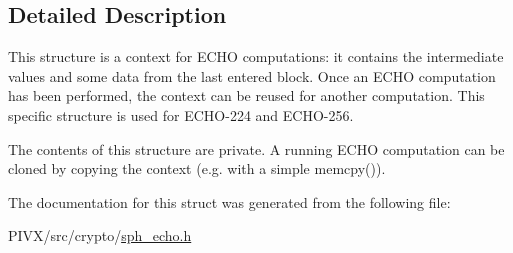 \subsection{Detailed Description}
This structure is a context for E\+C\+HO computations\+: it contains the intermediate values and some data from the last entered block. Once an E\+C\+HO computation has been performed, the context can be reused for another computation. This specific structure is used for E\+C\+H\+O-\/224 and E\+C\+H\+O-\/256.

The contents of this structure are private. A running E\+C\+HO computation can be cloned by copying the context (e.\+g. with a simple {\ttfamily memcpy()}). 

The documentation for this struct was generated from the following file\+:\begin{DoxyCompactItemize}
\item 
P\+I\+V\+X/src/crypto/\mbox{\hyperlink{sph__echo_8h}{sph\+\_\+echo.\+h}}\end{DoxyCompactItemize}
